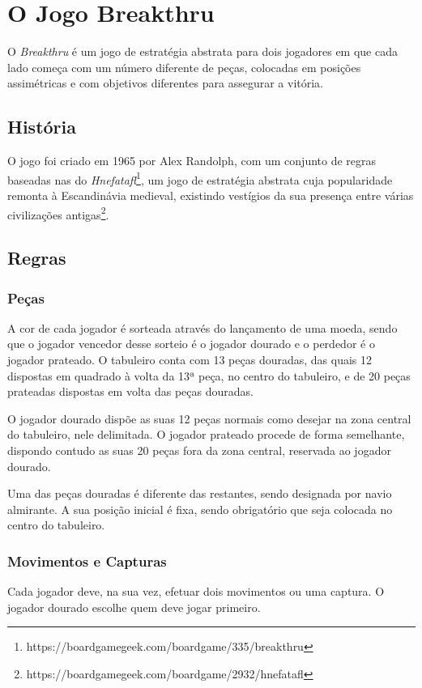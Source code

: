 \documentclass[a4paper]{article}
\begin{document}
\section{O Jogo Breakthru}
O \emph{Breakthru} é um jogo de estratégia abstrata para dois jogadores em que cada lado começa com um número diferente de peças, colocadas em posições assimétricas e com objetivos diferentes para assegurar a vitória.

\subsection{História}
O jogo foi criado em 1965 por Alex Randolph, com um conjunto de regras baseadas nas do \emph{Hnefatafl}\footnote{https://boardgamegeek.com/boardgame/335/breakthru}, um jogo de estratégia abstrata cuja popularidade remonta à Escandinávia medieval, existindo vestígios da sua presença entre várias civilizações antigas\footnote{https://boardgamegeek.com/boardgame/2932/hnefatafl}.
\

\subsection{Regras}
\subsubsection{Peças}
A cor de cada jogador é sorteada através do lançamento de uma moeda, sendo que o jogador vencedor desse sorteio é o jogador dourado e o perdedor é o jogador prateado. O tabuleiro conta com 13 peças douradas, das quais 12 dispostas em quadrado à volta da 13ª peça, no centro do tabuleiro, e de 20 peças prateadas dispostas em volta das peças douradas.

O jogador dourado dispõe as suas 12 peças normais como desejar na zona central do tabuleiro, nele delimitada. O jogador prateado procede de forma semelhante, dispondo contudo as suas 20 peças fora da zona central, reservada ao jogador dourado.

Uma das peças douradas é diferente das restantes, sendo designada por navio almirante. A sua posição inicial é fixa, sendo obrigatório que seja colocada no centro do tabuleiro.

\subsubsection{Movimentos e Capturas}
Cada jogador deve, na sua vez, efetuar dois movimentos ou uma captura. O jogador dourado escolhe quem deve jogar primeiro.
\end{document}
